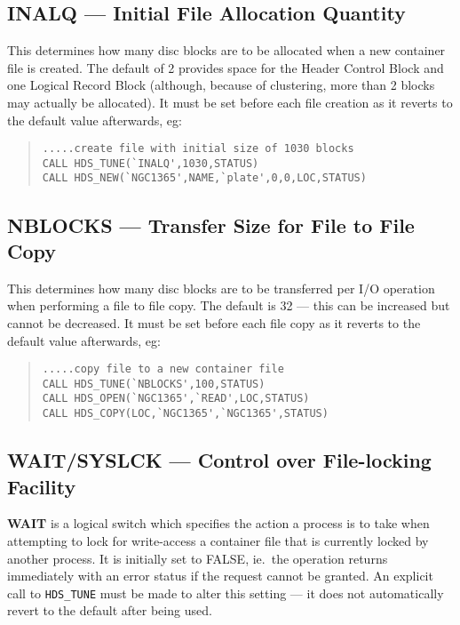 \subsection {INALQ --- Initial File Allocation Quantity}

This determines how many disc blocks are to be allocated when a new container
file is created. The default of 2 provides space for the Header Control Block
and one Logical Record Block (although, because of clustering, more than 2
blocks may actually be allocated). It must be set before each file creation as
it reverts to the default value afterwards, eg: 

\begin {quote}
\begin {verbatim}
.....create file with initial size of 1030 blocks
CALL HDS_TUNE(`INALQ',1030,STATUS)
CALL HDS_NEW(`NGC1365',NAME,`plate',0,0,LOC,STATUS)
\end{verbatim}
\end {quote}

\subsection {NBLOCKS --- Transfer Size for File to File Copy}

This determines how many disc blocks are to be transferred per I/O operation
when performing a file to file copy. The default is 32 --- this can be
increased but cannot be decreased. It must be set before each file copy as it
reverts to the default value afterwards, eg: 

\begin {quote}
\begin {verbatim}
.....copy file to a new container file
CALL HDS_TUNE(`NBLOCKS',100,STATUS)
CALL HDS_OPEN(`NGC1365',`READ',LOC,STATUS)
CALL HDS_COPY(LOC,`NGC1365',`NGC1365',STATUS)
\end{verbatim}
\end {quote}
                              
\subsection {WAIT/SYSLCK --- Control over File-locking Facility}

{\bf WAIT} is a logical switch which specifies the action a process is to take
when attempting to lock for write-access a container file that is currently
locked by another process. It is initially set to FALSE, ie.\ the operation
returns immediately with an error status if the request cannot be granted. An
explicit call to {\tt HDS\_TUNE} must be made to alter this setting --- it does
not automatically revert to the default after being used. 

